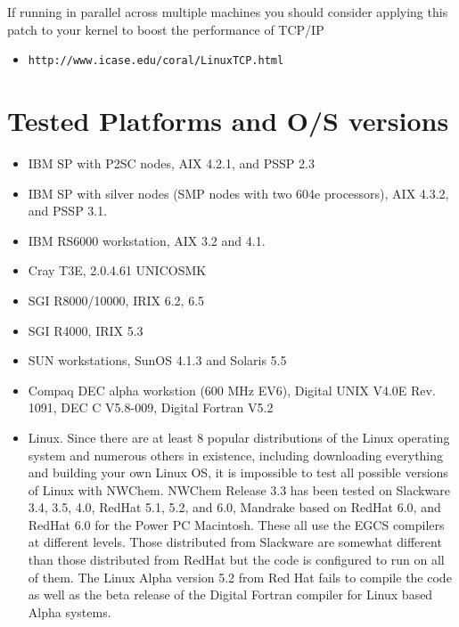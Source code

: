 If running in parallel across multiple machines you should consider
applying this patch to your kernel to boost the performance of TCP/IP
\begin{itemize}
\item \verb+http://www.icase.edu/coral/LinuxTCP.html+
\end{itemize}

\section{Tested Platforms and O/S versions}

\begin{itemize}
\item IBM SP with P2SC nodes,  AIX 4.2.1, and PSSP 2.3
\item IBM SP with silver nodes (SMP nodes with two 604e processors),
AIX 4.3.2, and PSSP 3.1.
\item IBM RS6000 workstation, AIX 3.2 and 4.1.
\item Cray T3E, 2.0.4.61 UNICOSMK
\item SGI R8000/10000, IRIX 6.2, 6.5
\item SGI R4000, IRIX 5.3
\item SUN workstations, SunOS 4.1.3 and Solaris 5.5
\item Compaq DEC alpha workstion (600 MHz EV6), Digital UNIX V4.0E
Rev. 1091, DEC C V5.8-009, Digital Fortran V5.2
\item Linux. Since there are at least 8 popular distributions of the
Linux operating system and numerous others in existence, including
downloading everything and building your own Linux OS, it is
impossible to test all possible versions of Linux with NWChem. NWChem
Release 3.3 has been tested on Slackware 3.4, 3.5, 4.0, RedHat 5.1,
5.2, and 6.0, Mandrake based on RedHat 6.0, and RedHat 6.0 for the
Power PC Macintosh.  These all use the EGCS compilers at different
levels.  Those distributed from Slackware are somewhat different than
those distributed from RedHat but the code is configured to run on all
of them.  The Linux Alpha version 5.2 from Red Hat fails to compile
the code as well as the beta release of the Digital Fortran compiler
for Linux based Alpha systems.

\end{itemize}

